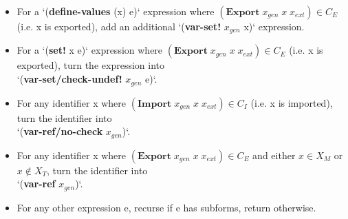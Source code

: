 		\begin{itemize}
		\small
		\item For a `(\textbf{define-values} (x) e)` expression where $(\textbf{Export}\; x_{gen}\; x\; x_{ext}) \in \mathit{C_E}$ (i.e. x is exported), add an additional `(\textbf{var-set!} $x_{gen}$ x)` expression.
		\item For a `(\textbf{set!} x e)` expression where $(\textbf{Export}\; x_{gen}\; x\; x_{ext}) \in \mathit{C_E}$ (i.e. x is exported), turn the expression into \\ `(\textbf{var-set/check-undef!} $x_{gen}$ e)`.
		\item For any identifier x where $(\textbf{Import}\; x_{gen}\; x\; x_{ext}) \in \mathit{C_I}$  (i.e. x is imported), turn the identifier into \\ `(\textbf{var-ref/no-check} $x_{gen}$)`.
		\item For any identifier x where $(\textbf{Export}\; x_{gen}\; x\; x_{ext}) \in \mathit{C_E}$ and either $x \in \mathit{X_M}$ or $x \notin \mathit{X_T}$, turn the identifier into \\ `(\textbf{var-ref} $x_{gen}$)`.
		\item For any other expression e, recurse if e has subforms, return otherwise.
		\end{itemize}


